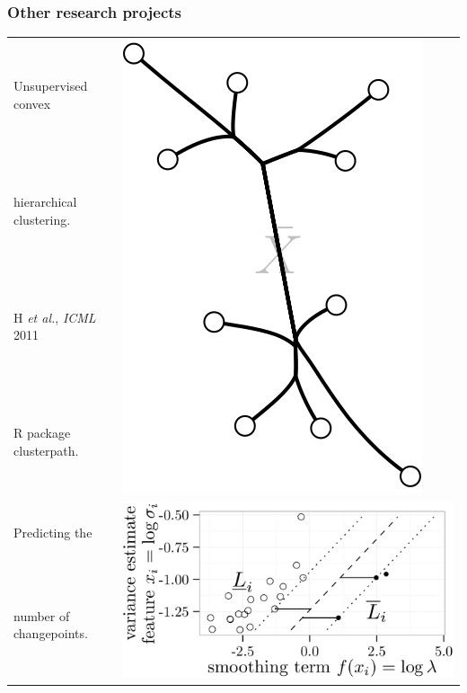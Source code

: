 \documentclass{beamer}
\begin{document}
\begin{frame}
  \frametitle{Other research projects}
  \begin{tabular}{ll}
Unsupervised convex & \multirow{4}{*}{
\includegraphics[height=0.2\textheight]{screenshot-clusterpath}
}\\
hierarchical clustering.\\
H {\it et al.}, {\it ICML} 2011\\
R package clusterpath. \\
\hline
Predicting the  & \multirow{4}{*}{
\includegraphics[height=0.25\textheight]{Screenshot-max-margin}
}\\
number of changepoints.\\

\end{tabular}
\end{frame}
\end{document}
